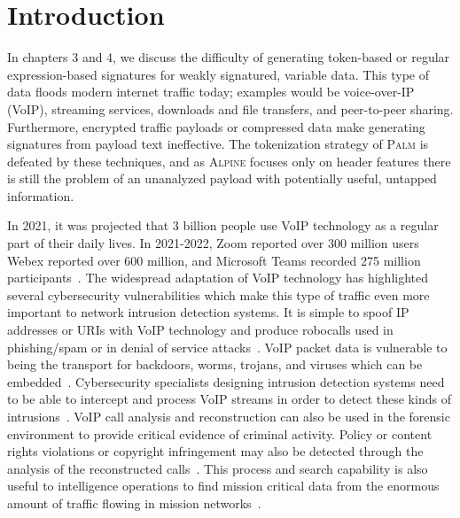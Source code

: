 \section{Introduction}

In chapters 3 and 4, we discuss the difficulty of generating token-based or regular expression-based signatures for weakly signatured, variable data. This type of data floods modern internet traffic today; examples would be voice-over-IP (VoIP), streaming services, downloads and file transfers, and peer-to-peer sharing. Furthermore, encrypted traffic payloads or compressed data make generating signatures from payload text ineffective. The tokenization strategy of \textsc{Palm} is defeated by these techniques, and as \textsc{Alpine} focuses only on header features there is still the problem of an unanalyzed payload with potentially useful, untapped information.

In 2021, it was projected that 3 billion people use VoIP technology as a regular part of their daily lives. In 2021-2022, Zoom reported over 300 million users~\cite{teamstage} Webex reported over 600 million, and Microsoft Teams recorded 275 million participants~\cite{businessofapps}. The widespread adaptation of VoIP technology has highlighted several cybersecurity vulnerabilities which make this type of traffic even more important to network intrusion detection systems. It is simple to spoof IP addresses or URIs with VoIP technology and produce robocalls used in phishing/spam or in denial of service attacks~\cite{edwards2020robocalling}. VoIP packet data is vulnerable to being the transport for backdoors, worms, trojans, and viruses which can be embedded~\cite{Wu2021SteganographyAS, nagaraja2019voiploc}. Cybersecurity specialists designing intrusion detection systems need to be able to intercept and process VoIP streams in order to detect these kinds of intrusions~\cite{choti2021prediction}. VoIP call analysis and reconstruction can also be used in the forensic environment to provide critical evidence of criminal activity. Policy or content rights violations or copyright infringement may also be detected through the analysis of the reconstructed calls~\cite{kmetfast, Sha2016VoIPFA}. This process and search capability is also useful to intelligence operations to find mission critical data from the enormous amount of traffic flowing in mission networks~\cite{kao2020forensic}.

